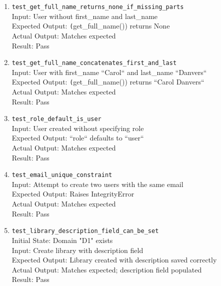 \documentclass[12pt, titlepage]{article}
\begin{document}
\begin{enumerate}
      \\Input: User with email ``alice@example.com``
      \\Expected Output: \texttt(str(user)) returns the email
      \\Actual Output: Matches expected
      \\Result: Pass
    \item \texttt{test\_get\_full\_name\_returns\_none\_if\_missing\_parts} \label{test-get-full-name-none}
      \\Input: User without first\_name and last\_name
      \\Expected Output: \texttt(get\_full\_name()) returns None
      \\Actual Output: Matches expected
      \\Result: Pass
    \item \texttt{test\_get\_full\_name\_concatenates\_first\_and\_last} \label{test-get-full-name-concat}
      \\Input: User with first\_name ``Carol`` and last\_name ``Danvers``
      \\Expected Output: \texttt(get\_full\_name()) returns ``Carol Danvers``
      \\Actual Output: Matches expected
      \\Result: Pass
    \item \texttt{test\_role\_default\_is\_user} \label{test-role-default-user}
      \\Input: User created without specifying role
      \\Expected Output: ``role`` defaults to ``user``
      \\Actual Output: Matches expected
      \\Result: Pass
    \item \texttt{test\_email\_unique\_constraint} \label{test-email-unique-constraint}
      \\Input: Attempt to create two users with the same email
      \\Expected Output: Raises IntegrityError
      \\Actual Output: Matches expected
      \\Result: Pass
    \item \texttt{test\_library\_description\_field\_can\_be\_set} \label{test-library-description-field-can-be-set}
      \\Initial State: Domain "D1" exists
      \\Input: Create library with description field
      \\Expected Output: Library created with description saved correctly
      \\Actual Output: Matches expected; description field populated
      \\Result: Pass


\end{enumerate}
\end{document}
